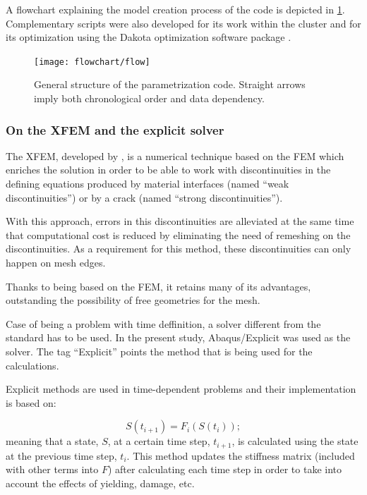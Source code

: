\documentclass[cmfonts]{witpress}
\begin{document}
A flowchart explaining the model creation process of the code is depicted in \cref{fig:flow}. Complementary scripts were also developed for its work within the cluster and for its optimization using the Dakota optimization software package \cite{dakota}.

\begin{figure}
	\centering
	\texttt{[image: flowchart/flow]}
	\caption[General structure of the parameterized code.]{General structure of the parametrization code. Straight arrows imply both chronological order and data dependency.}
	\label{fig:flow}
\end{figure}


\subsubsection{On the XFEM and the explicit solver}
\label{sec:xfem}

The XFEM, developed by \cite{Moes1999}, is a numerical technique based on the FEM which enriches the solution in order to be able to work with discontinuities in the defining equations produced by material interfaces (named ``weak discontinuities'') or by a crack (named ``strong discontinuities'').

With this approach, errors in this discontinuities are alleviated at the same time that computational cost is reduced by eliminating the need of remeshing on the discontinuities. As a requirement for this method, these discontinuities can only happen on mesh edges.

Thanks to being based on the FEM, it retains many of its advantages, outstanding the possibility of free geometries for the mesh.

Case of being a problem with time deffinition, a solver different from the standard has to be used. In the present study, Abaqus/Explicit was used as the solver. The tag ``Explicit'' points the method that is being used for the calculations.

Explicit methods are used in time-dependent problems and their implementation is based on:

\begin{equation}
S\left(t_{i+1}\right) = F_{i}\left(S\left(t_{i}\right)\right) ;
\label{eq:explicit}
\end{equation}
meaning that a state, $S$, at a certain time step, $t_{i+1}$, is calculated using the state at the previous time step, $t_{i}$. This method updates the stiffness matrix (included with other terms into $F$) after calculating each time step in order to take into account the effects of yielding, damage, etc.
\end{document}
